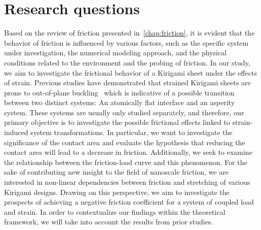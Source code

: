 



\section{Research questions}\label{sec:research_questions}
Based on the review of friction presented in~\cref{chap:friction}, it is evident that the behavior of friction is influenced by various factors, such as the specific system under investigation, the numerical modeling approach, and the physical conditions related to the environment and the probing of friction. In our study, we aim to investigate the frictional behavior
of a Kirigami sheet under the effects of strain. Previous studies have
demonstrated that strained Kirigami sheets are prone to out-of-plane buckling~\cite{PhysRevLett.121.255304, PhysRevResearch.2.042006} which is indicative of a possible transition between two distinct systems: An atomically flat interface and an asperity system. These systems are usually only studied
separately, and therefore, our primary objective is to investigate the possible frictional effects linked to strain-induced system transformations. In particular, we want to investigate the significance of the contact area and evaluate the hypothesis that reducing the contact area will lead to a decrease in friction. Additionally, we seek to examine the relationship between the friction-load curve and this phenomenon. For the sake of contributing new insight to the field of nanoscale
friction, we are interested in non-linear dependencies between
friction and stretching of various Kirigami designs. Drawing on this
perspective, we aim to investigate the prospects of achieving a negative friction coefficient for a system of coupled load and strain. In order to contextualize our findings within the theoretical framework, we will take into account the results from prior studies.


